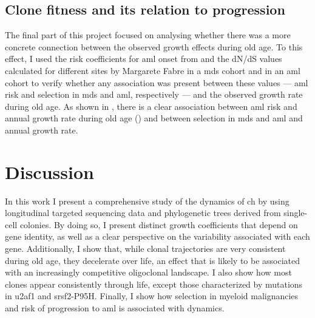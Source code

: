 \subsection{Clone fitness and its relation to progression}

The final part of this project focused on analysing whether there was a more concrete connection between the observed growth effects during old age. To this effect, I used the risk coefficients for \ac{aml} onset from \cite{Abelson2018-wh} and the dN/dS values calculated for different sites by Margarete Fabre in a \ac{mds} cohort and in an \ac{aml} cohort to verify whether any association was present between these values --- \ac{aml} risk and selection in \ac{mds} and \ac{aml}, respectively --- and the observed growth rate during old age. As shown in , there is a clear association between \ac{aml} risk and annual growth rate during old age () and between selection in \ac{mds} and \ac{aml} and annual growth rate.

\begin{figure}[!ht]
	\label{fig:ch-risk-selection}
\end{figure}

\FloatBarrier

\section{Discussion}

In this work I present a comprehensive study of the dynamics of \ac{ch} by using longitudinal targeted sequencing data and phylogenetic trees derived from single-cell colonies. By doing so, I present distinct growth coefficients that depend on gene identity, as well as a clear perspective on the variability associated with each gene. Additionally, I show that, while clonal trajectories are very consistent during old age, they decelerate over life, an effect that is likely to be associated with an increasingly competitive oligoclonal landscape. I also show how most clones appear consistently through life, except those characterized by mutations in \ac{u2af1} and \ac{srsf2}-P95H. Finally, I show how selection in myeloid malignancies and risk of progression to \ac{aml} is associated with dynamics.

